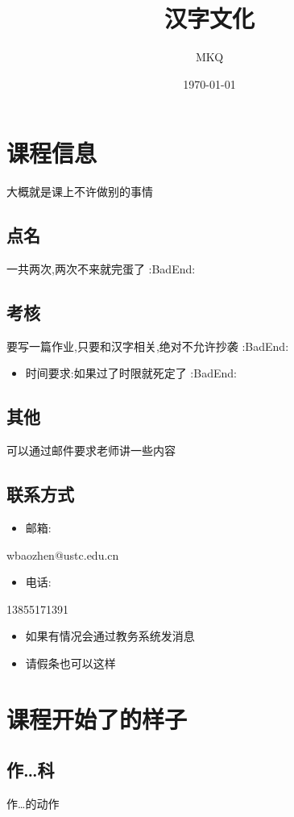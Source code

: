\documentclass[11pt]{article}
\author{MKQ}
\date{\today}
\title{汉字文化}
\begin{document}
\maketitle
\tableofcontents

\section{课程信息}
\label{sec:orgae64fe5}
大概就是课上不许做别的事情
\subsection{点名}
\label{sec:org973eca0}
一共两次,两次不来就完蛋了 :BadEnd:
\subsection{考核}
\label{sec:orgd073c0e}
要写一篇作业,只要和汉字相关,绝对不允许抄袭 :BadEnd:
\begin{itemize}
\item 时间要求:如果过了时限就死定了 :BadEnd:
\end{itemize}
\subsection{其他}
\label{sec:orgc61028b}
可以通过邮件要求老师讲一些内容
\subsection{联系方式}
\label{sec:org6253115}
\begin{itemize}
\item 邮箱:
\end{itemize}
wbaozhen@ustc.edu.cn
\begin{itemize}
\item 电话:
\end{itemize}
13855171391
\begin{itemize}
\item 如果有情况会通过教务系统发消息
\item 请假条也可以这样
\end{itemize}
\section{课程开始了的样子}
\label{sec:org11636f4}
\subsection{作\ldots{}科}
\label{sec:org33e4be3}
作\ldots{}的动作
\end{document}
